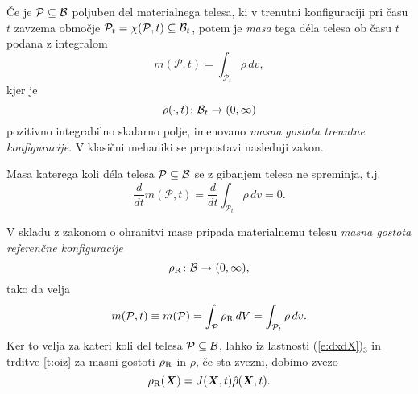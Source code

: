 Če je $\mathcal{P}\subseteq\mathcal B$ poljuben del materialnega telesa, ki v trenutni konfiguraciji pri času $t$
zavzema območje $\mathcal{P}_t=\chi(\mathcal{P},t)\subseteq\mathcal B_t$, potem je \emph{masa} tega déla telesa
ob času $t$ podana z integralom
\[ m(\mathcal{P},t)=\int_{\mathcal{P}_t}\rho\,dv, \]
kjer je
\[ \rho(\cdot,t)\colon\mathcal B_t\to(0,\infty) \]
pozitivno integrabilno skalarno polje, imenovano
\emph{masna gostota trenutne konfiguracije}. V klasični mehaniki se prepostavi naslednji zakon.
\begin{aksiom}
	Masa katerega koli déla telesa $\mathcal{P}\subseteq\mathcal B$ se z gibanjem telesa ne spreminja, t.j.
	\[ \frac{d}{dt}m(\mathcal{P},t)=\frac{d}{dt}\int_{\mathcal{P}_t}\rho\,dv=0. \]
\end{aksiom}
V skladu z zakonom o ohranitvi mase pripada materialnemu telesu \emph{masna gostota referenčne konfiguracije}
\[ \rho_{\mathrm R}\colon\mathcal B\to(0,\infty), \]
tako da velja
\[ m(\mathcal{P},t)\equiv m(\mathcal{P})=\int_{\mathcal{P}}\rho_{\mathrm R}\,dV=\int_{\mathcal{P}_t}\rho\,dv. \]
Ker to velja za kateri koli del telesa $\mathcal{P}\subseteq\mathcal B$, lahko iz lastnosti (\ref{e:dxdX})${}_3$ in trditve \ref{t:oiz}
za masni gostoti $\rho_{\mathrm R}$ in $\rho$, če sta zvezni, dobimo zvezo
\[ \rho_{\mathrm R}(\boldsymbol X)=J(\boldsymbol X,t)\hat{\rho}(\boldsymbol X,t). \]






